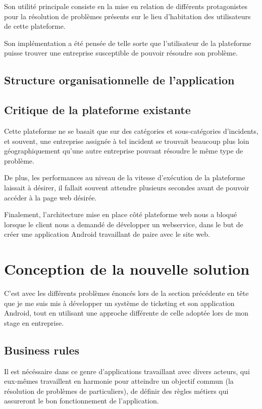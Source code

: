 \documentclass[12pt,table,a4paper]{report}
\begin{document}
Son utilité principale consiste en la mise en relation de différents protagonistes pour la résolution de problèmes présents sur le lieu d'habitation des utilisateurs de cette plateforme.

Son implémentation a été pensée de telle sorte que l'utilisateur de la plateforme puisse trouver une entreprise susceptible de pouvoir résoudre son problème.

\subsection{Structure organisationnelle de l'application}


\subsection{Critique de la plateforme existante}
Cette plateforme ne se basait que sur des catégories et sous-catégories d'incidents, et souvent, une entreprise assignée à tel incident se trouvait beaucoup plus loin géographiquement qu'une autre entreprise pouvant résoudre le même type de problème.

De plus, les performances au niveau de la vitesse d'exécution de la plateforme laissait à désirer, il fallait souvent attendre plusieurs secondes avant de pouvoir accéder à la page web désirée.

Finalement, l'architecture mise en place côté plateforme web nous a bloqué lorsque le client nous a demandé de développer un webservice, dans le but de créer une application Android travaillant de paire avec le site web.

\section{Conception de la nouvelle solution}
C'est avec les différents problèmes énoncés lors de la section précédente en tête que je me suis mis à développer un système de ticketing et son application Android, tout en utilisant une approche différente de celle adoptée lors de mon stage en entreprise.

\subsection{Business rules}
Il est nécéssaire dans ce genre d'applications travaillant avec divers acteurs, qui eux-mêmes travaillent en harmonie pour atteindre un objectif commun (la résolution de problèmes de particuliers), de définir des règles métiers qui assureront le bon fonctionnement de l'application.
\end{document}

